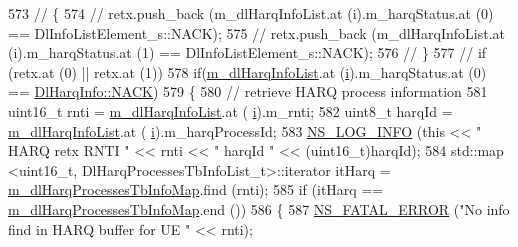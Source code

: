 \begin{DoxyCode}
{573                         \textcolor{comment}{//                                \{}
574                         \textcolor{comment}{//                                  retx.push\_back (m\_dlHarqInfoList.at
       (i).m\_harqStatus.at (0) == DlInfoListElement\_s::NACK);}
575                         \textcolor{comment}{//                                  retx.push\_back (m\_dlHarqInfoList.at
       (i).m\_harqStatus.at (1) == DlInfoListElement\_s::NACK);}
576                         \textcolor{comment}{//                                \}}
577                         \textcolor{comment}{//                              if (retx.at (0) || retx.at (1))}
578                         \textcolor{keywordflow}{if}(\hyperlink{classns3_1_1MmWaveRrMacScheduler_a1b1043d7f9994e2ee6a7e1b368e9d7a1}{m\_dlHarqInfoList}.at (\hyperlink{bernuolliDistribution_8m_a6f6ccfcf58b31cb6412107d9d5281426}{i}).m\_harqStatus.at (0) == 
      \hyperlink{structns3_1_1DlHarqInfo_a922d2bc13ae01f93cde1a8b4bfccad14ae0560b883a5e22a4d4c40ac562e80374}{DlHarqInfo::NACK})
579                         \{
580                                 \textcolor{comment}{// retrieve HARQ process information}
581                                 uint16\_t rnti = \hyperlink{classns3_1_1MmWaveRrMacScheduler_a1b1043d7f9994e2ee6a7e1b368e9d7a1}{m\_dlHarqInfoList}.at (
      \hyperlink{bernuolliDistribution_8m_a6f6ccfcf58b31cb6412107d9d5281426}{i}).m\_rnti;
582                                 uint8\_t harqId = \hyperlink{classns3_1_1MmWaveRrMacScheduler_a1b1043d7f9994e2ee6a7e1b368e9d7a1}{m\_dlHarqInfoList}.at (
      \hyperlink{bernuolliDistribution_8m_a6f6ccfcf58b31cb6412107d9d5281426}{i}).m\_harqProcessId;
583                                 \hyperlink{group__logging_gafbd73ee2cf9f26b319f49086d8e860fb}{NS\_LOG\_INFO} (\textcolor{keyword}{this} << \textcolor{stringliteral}{" HARQ retx RNTI "} << rnti << \textcolor{stringliteral}{" harqId "} <<
       (uint16\_t)harqId);
584                                 std::map <uint16\_t, DlHarqProcessesTbInfoList\_t>::iterator itHarq = 
      \hyperlink{classns3_1_1MmWaveRrMacScheduler_a8d14c222701c0a57ecbd40a51d0391da}{m\_dlHarqProcessesTbInfoMap}.find (rnti);
585                                 \textcolor{keywordflow}{if} (itHarq == \hyperlink{classns3_1_1MmWaveRrMacScheduler_a8d14c222701c0a57ecbd40a51d0391da}{m\_dlHarqProcessesTbInfoMap}.end ())
586                                 \{
587                                         \hyperlink{group__fatal_ga5131d5e3f75d7d4cbfd706ac456fdc85}{NS\_FATAL\_ERROR} (\textcolor{stringliteral}{"No info find in HARQ buffer for UE "}
       << rnti);
}
\end{DoxyCode}
